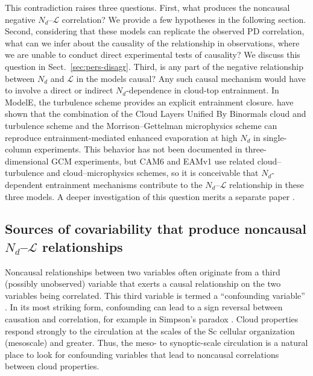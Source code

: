 \documentclass[acp, manuscript]{copernicus}\usepackage[]{graphicx}\usepackage[]{xcolor}
\newcommand{\jmu}{\ensuremath{j_\mu}}
\newcommand{\jmcomment}[1]{\todo[inline, color=red!50]{\jmu: #1}}
\newcommand\nd{\ensuremath{N_d}}
\newcommand\lwp{\ensuremath{\mathcal L}}
\begin{document}
This contradiction raises three questions.  First, what
produces the noncausal negative \nd--\lwp{} correlation?  We provide a few hypotheses in the
following section.  Second, considering that these models can
replicate the observed PD correlation, what can we infer about the causality of the
relationship in observations, where we are unable to conduct direct
experimental tests of causality?  We discuss this question in Sect.~\ref{sec:pers-disagr}.
Third, is any part of the negative relationship between \nd{} and \lwp{} in the
models causal?  Any such causal mechanism would have to involve a direct or
indirect \nd{}-dependence in cloud-top entrainment.  In ModelE, the \citet{Bretherton2009} turbulence
scheme provides an explicit entrainment closure.  \citet{Guo2011} have shown that the combination of the
Cloud Layers Unified By Binormals \citep[CLUBB;][]{Larson2005,Golaz2007} cloud
and turbulence scheme and the Morrison--Gettelman microphysics scheme
\citep{Morrison2008,Salzmann2010} can reproduce entrainment-mediated enhanced
evaporation at high \nd{} in single-column experiments.  This behavior has not
been documented in three-dimensional GCM experiments, but CAM6 and EAMv1 use related
cloud--turbulence \citep{Bogenschutz2013,Larson2017} and cloud--microphysics
\citep{Gettelman2015} schemes, so it is conceivable that \nd{}-dependent
entrainment mechanisms contribute to the \nd--\lwp{} relationship in these three
models. A deeper investigation of this question merits a separate paper \citep[part 2 of this series,][]{Muelmenstaedt2023b}.

\subsection{Sources of covariability that produce noncausal \nd--\lwp{}
  relationships}
\label{sec:covariability-sources}

Noncausal relationships between two variables often originate from a third
(possibly unobserved) variable that exerts a causal relationship on the two
variables being correlated.  This third variable is termed a ``confounding
variable'' \citep{thebookofwhy}.  In its most striking form, confounding can lead
to a sign reversal between causation and correlation, for example in Simpson's paradox
\citep{Simpson1951,Feingold2022}.
Cloud properties respond strongly to the circulation at the scales of
the Sc cellular organization (mesoscale) and greater.
Thus, the meso- to
synoptic-scale circulation is a natural place to look for confounding variables that lead to
noncausal correlations between cloud properties.
\end{document}
